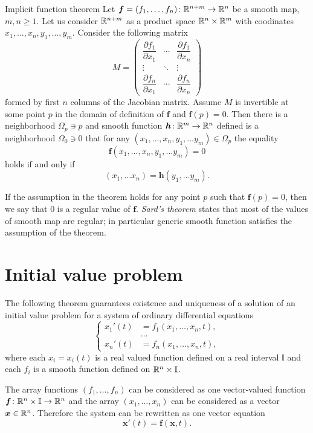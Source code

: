 \begin{thm}{Implicit function theorem}\label{thm:imlicit}
Let $\bm{f}=(f_1,\dots,f_n)\colon\mathbb{R}^{n+m}\to\mathbb{R}^n$ be a smooth map,
$m,n\ge 1$.
Let us consider $\mathbb{R}^{n+m}$ as a product space $\mathbb{R}^n\times \mathbb{R}^m$ with coodinates 
$x_1,\dots,x_n,y_1,\dots,y_m$.
Consider the following matrix 
\[
M=\begin{pmatrix}
\dfrac{\partial f_1}{\partial x_1} & \cdots & \dfrac{\partial f_1}{\partial x_n}\\
\vdots & \ddots & \vdots\\
\dfrac{\partial f_n}{\partial x_1} & \cdots & \dfrac{\partial f_n}{\partial x_n} \end{pmatrix}\]
formed by first $n$ columns of the Jacobian matrix.
Assume $M$ is invertible at some point $p$ in the domain of definition of $\bm{f}$ and $\bm{f}(p)=0$.
Then there is a neighborhood $\Omega_p\ni p$
and smooth function $\bm{h}\colon\mathbb{R}^m\to\mathbb{R}^n$ defined is a neighborhood $\Omega_0\ni 0$ that
for any $(x_1,\dots,x_n,y_1,\dots y_m)\in \Omega_p$ the equality
\[\bm{f}(x_1,\dots,x_n,y_1,\dots y_m)=0\]
holds if and only if 
\[(x_1,\dots x_n)=\bm{h}(y_1,\dots y_m).\]

\end{thm}

If the assumption in the theorem holds for any point $p$ such that $\bm{f}(p)=0$,
then we say that $0$ is a regular value of $\bm{f}$.
\emph{Sard's theorem} states that most of the values of smooth map are regular; in particular generic smooth function satisfies the assumption of the theorem.

\section*{Initial value problem}

The following theorem guarantees existence and uniqueness of a solution of an initial value problem
for a system of ordinary differential equations
\[
\begin{cases}
x_1'(t)&=f_1(x_1,\dots,x_n,t),
\\
&\dots
\\
x_n'(t)&=f_n(x_1,\dots,x_n,t),
\end{cases}
\]
where each $x_i=x_i(t)$ is a real valued function defined on a real interval $\mathbb{I}$
and each $f_i$ is a smooth function defined on $\mathbb{R}^n\times \mathbb{I}$.

The array functions $(f_1,\dots,f_n)$ can be considered as one vector-valued function 
$\bm{f}\colon\mathbb{R}^n\times \mathbb{I}\to \mathbb{R}^n$ and the array $(x_1,\dots,x_n)$ can be considered as a vector  $\bm{x}\in\mathbb{R}^n$.
Therefore the system can be rewritten as one vector equation 
\[\bm{x}'(t)=\bm{f}(\bm{x}, t).\] 

